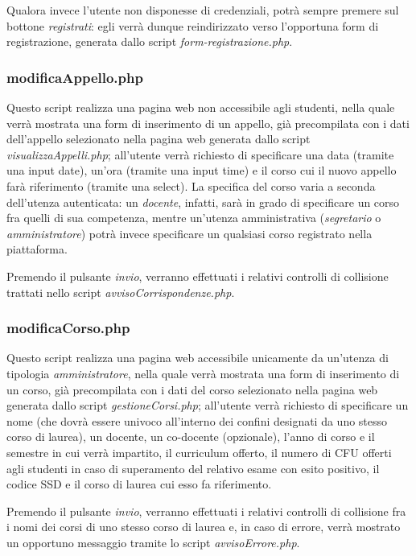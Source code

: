 \documentclass [a4paper,11pt]{book}
\begin{document}
Qualora invece l'utente non disponesse di credenziali, potrà sempre premere sul bottone \emph{registrati}: egli verrà dunque reindirizzato verso l'opportuna form di registrazione, generata dallo script \emph{form-registrazione.php}.

\medskip

\subsubsection{modificaAppello.php}

Questo script realizza una pagina web non accessibile agli studenti, nella quale verrà mostrata una form di inserimento di un appello, già precompilata con i dati dell'appello selezionato nella pagina web generata dallo script \emph{visualizzaAppelli.php}; all'utente verrà richiesto di specificare una data (tramite una input date), un'ora (tramite una input time) e il corso cui il nuovo appello farà riferimento (tramite una select). La specifica del corso varia a seconda dell'utenza autenticata: un \emph{docente}, infatti, sarà in grado di specificare un corso fra quelli di sua competenza, mentre un'utenza amministrativa (\emph{segretario} o \emph{amministratore}) potrà invece specificare un qualsiasi corso registrato nella piattaforma.

Premendo il pulsante \emph{invio}, verranno effettuati i relativi controlli di collisione trattati nello script \emph{avvisoCorrispondenze.php}.

\medskip

\subsubsection{modificaCorso.php}

Questo script realizza una pagina web accessibile unicamente da un'utenza di tipologia \emph{amministratore}, nella quale verrà mostrata una form di inserimento di un corso, già precompilata con i dati del corso selezionato nella pagina web generata dallo script \emph{gestioneCorsi.php}; all'utente verrà richiesto di specificare un nome (che dovrà essere univoco all'interno dei confini designati da uno stesso corso di laurea), un docente, un co-docente (opzionale), l'anno di corso e il semestre in cui verrà impartito, il curriculum offerto, il numero di CFU offerti agli studenti in caso di superamento del relativo esame con esito positivo, il codice SSD e il corso di laurea cui esso fa riferimento.

Premendo il pulsante \emph{invio}, verranno effettuati i relativi controlli di collisione fra i nomi dei corsi di uno stesso corso di laurea e, in caso di errore, verrà mostrato un opportuno messaggio tramite lo script \emph{avvisoErrore.php}.
\end{document}
